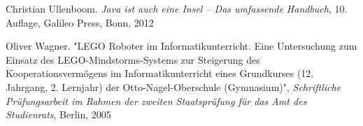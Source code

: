 \begin{thebibliography}{ABCDEF}


Christian Ullenboom. \emph{Java ist auch eine Insel -- Das umfassende Handbuch}, 10. Auflage, Galileo Press, Bonn, 2012

Oliver Wagner. "LEGO Roboter im Informatikunterricht. Eine Untersuchung zum Einsatz des LEGO-Mindstorms-Systems zur Steigerung des Kooperationsvermögens im Informatikunterricht eines Grundkurses (12. Jahrgang, 2. Lernjahr) der Otto-Nagel-Oberschule (Gymnasium)", \emph{Schriftliche Prüfungsarbeit im Rahmen der zweiten Staatsprüfung für das Amt des Studienrats}, Berlin, 2005

\end{thebibliography}
